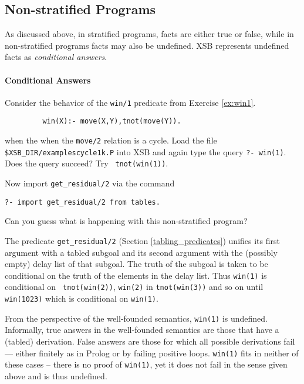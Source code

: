 \subsection{Non-stratified Programs}

As discussed above, in stratified programs, facts are either true or
false, while in non-stratified programs facts may also be undefined.
XSB represents undefined facts as {\em conditional answers}.

\paragraph*{Conditional Answers}

\begin{exercise}
Consider the behavior of the {\tt win/1} predicate from Exercise
\ref{ex:win1}.
\begin{verbatim}
         win(X):- move(X,Y),tnot(move(Y)).
\end{verbatim}
when the when the {\tt move/2} relation is a cycle.  Load the file
{\tt \verb|$XSB_DIR/examples|cycle1k.P} into XSB and again type the
query {\tt ?- win(1)}.  Does the query succeed?  Try {\tt
tnot(win(1))}.

Now import {\tt get\_residual/2} via the command
\begin{verbatim}
?- import get_residual/2 from tables.
\end{verbatim}
Can you guess what is happening with this non-stratified program?
\end{exercise}

The predicate {\tt get\_residual/2} (Section \ref{tabling_predicates})
unifies its first argument with a tabled subgoal and its second
argument with the (possibly empty) delay list of that subgoal.  The
truth of the subgoal is taken to be conditional on the truth of the
elements in the delay list.  Thus {\tt win(1)} is conditional on {\tt
tnot(win(2))}, {\tt win(2)} in {\tt tnot(win(3))} and so on until {\tt
win(1023)} which is conditional on {\tt win(1)}.

From the perspective of the well-founded semantics, {\tt win(1)} is
undefined.  Informally, true answers in the well-founded semantics are
those that have a (tabled) derivation.  False answers are those for
which all possible derivations fail --- either finitely as in Prolog
or by failing positive loops.  {\tt win(1)} fits in neither of these
cases -- there is no proof of {\tt win(1)}, yet it does not fail in
the sense given above and is thus undefined.

